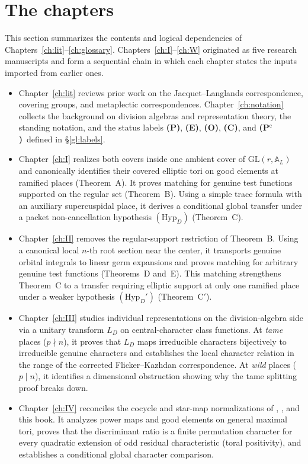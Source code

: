 \documentclass[12pt,letterpaper,oneside]{book}
\theoremstyle{plain}
\theoremstyle{definition}
\newcommand{\Pv}{\textbf{(P)}}
\newcommand{\Ev}{\textbf{(E)}}
\newcommand{\Cv}{\textbf{(C)}}
\newcommand{\Ov}{\textbf{(O)}}
\newcommand{\Pctag}{\textnormal{\textbf{(P$^{\mathrm c}$)}}}
\begin{document}
\section{The chapters}\label{sec:chapters}
This section summarizes the contents and logical dependencies of Chapters~\ref{ch:lit}--\ref{ch:glossary}. Chapters~\ref{ch:I}--\ref{ch:W} originated as five research manuscripts and form a sequential chain in which each chapter states the inputs imported from earlier ones.
\begin{itemize}[leftmargin=*]
\item Chapter~\ref{ch:lit} reviews prior work on the Jacquet--Langlands correspondence, covering groups, and metaplectic correspondences. Chapter~\ref{ch:notation} collects the background on division algebras and representation theory, the standing notation, and the status labels \Pv, \Ev, \Ov, \Cv, and \Pctag\ defined in \S\ref{gl:labels}.
\item Chapter~\ref{ch:I} realizes both covers inside one ambient cover of $\mathrm{GL}(r,\mathbb A_L)$ and canonically identifies their covered elliptic tori on good elements at ramified places (Theorem~A). It proves matching for genuine test functions supported on the regular set (Theorem~B). Using a simple trace formula with an auxiliary supercuspidal place, it derives a conditional global transfer under a packet non-cancellation hypothesis $(\mathrm{Hyp}_D)$ (Theorem~C).
\item Chapter~\ref{ch:II} removes the regular-support restriction of Theorem~B. Using a canonical local $n$-th root section near the center, it transports genuine orbital integrals to linear germ expansions and proves matching for arbitrary genuine test functions (Theorems~D and~E). This matching strengthens Theorem~C to a transfer requiring elliptic support at only one ramified place under a weaker hypothesis $(\mathrm{Hyp}_D')$ (Theorem~C$'$).
\item Chapter~\ref{ch:III} studies individual representations on the division-algebra side via a unitary transform $L_D$ on central-character class functions. At \emph{tame} places ($p\nmid n$), it proves that $L_D$ maps irreducible characters bijectively to irreducible genuine characters and establishes the local character relation in the range of the corrected Flicker--Kazhdan correspondence. At \emph{wild} places ($p\mid n$), it identifies a dimensional obstruction showing why the tame splitting proof breaks down.
\item Chapter~\ref{ch:IV} reconciles the cocycle and star-map normalizations of \cite{FK86}, \cite{Zo23}, and this book. It analyzes power maps and good elements on general maximal tori, proves that the discriminant ratio is a finite permutation character for every quadratic extension of odd residual characteristic (toral positivity), and establishes a conditional global character comparison.

\end{itemize}
\end{document}
